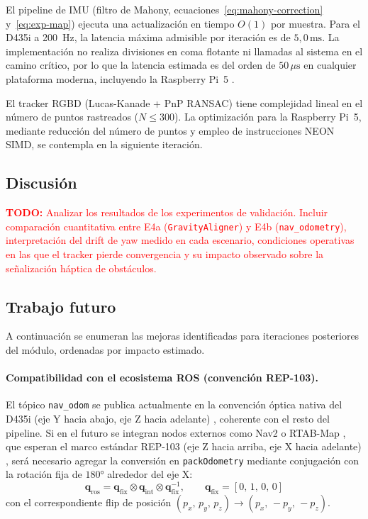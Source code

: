 El pipeline de IMU (filtro de Mahony, ecuaciones~\ref{eq:mahony-correction}
y~\ref{eq:exp-map}) ejecuta una actualización en tiempo $O(1)$ por muestra.
Para el D435i a 200~Hz, la latencia máxima admisible por iteración es de
$5{,}0\,\text{ms}$. La implementación no realiza divisiones en coma flotante
ni llamadas al sistema en el camino crítico, por lo que la latencia estimada
es del orden de $50\,\mu\text{s}$ en cualquier plataforma moderna, incluyendo
la Raspberry Pi~5 \cite{RaspberryPi}.

El tracker RGBD (Lucas-Kanade + PnP RANSAC) tiene complejidad lineal en el
número de puntos rastreados ($N \leq 300$). La optimización para la Raspberry
Pi~5, mediante reducción del número de puntos y empleo de instrucciones NEON
SIMD, se contempla en la siguiente iteración.

\subsection{Discusión}
\label{sec:lm-vio-discusion}

\textcolor{red}{\textbf{TODO:} Analizar los resultados de los experimentos de validación.
Incluir comparación cuantitativa entre E4a (\texttt{GravityAligner}) y E4b
(\texttt{nav\_odometry}), interpretación del drift de yaw medido en cada escenario,
condiciones operativas en las que el tracker pierde convergencia y su impacto
observado sobre la señalización háptica de obstáculos.}

\subsection{Trabajo futuro}
\label{sec:lm-vio-futuro}

A continuación se enumeran las mejoras identificadas para iteraciones
posteriores del módulo, ordenadas por impacto estimado.

\paragraph{Compatibilidad con el ecosistema ROS (convención REP-103).}
El tópico \texttt{nav\_odom} se publica actualmente en la convención óptica
nativa del D435i (eje Y hacia abajo, eje Z hacia adelante) \cite{RS-D400},
coherente con el resto del pipeline. Si en el futuro se integran nodos
externos como Nav2 o RTAB-Map \cite{Labbe2019RTAB}, que esperan el marco
estándar REP-103 (eje Z hacia arriba, eje X hacia adelante) \cite{REP103},
será necesario agregar la conversión en \texttt{packOdometry} mediante
conjugación con la rotación fija de $180°$ alrededor del eje X:
%
\begin{equation}
  \label{eq:frame-conversion-futuro}
  \mathbf{q}_{\text{ros}} =
  \mathbf{q}_{\text{fix}} \otimes
  \mathbf{q}_{\text{int}} \otimes
  \mathbf{q}_{\text{fix}}^{-1},
  \qquad
  \mathbf{q}_{\text{fix}} = [0,\,1,\,0,\,0]
\end{equation}
%
con el correspondiente flip de posición
$(p_x,\,p_y,\,p_z) \to (p_x,\,-p_y,\,-p_z)$.

